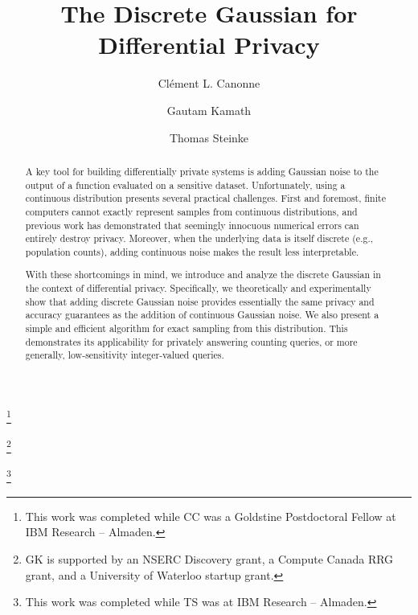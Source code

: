 \documentclass{jpcfinal} %
\begin{document}
\title{The Discrete Gaussian for Differential Privacy\rsuper*}

\author[C.~Canonne]{Cl\'ement L. Canonne}	\address{School of Computer Science, University of Sydney}	  \thanks{This work was completed while CC was a Goldstine Postdoctoral Fellow at IBM Research -- Almaden.}	

\author[G.~Kamath]{Gautam Kamath}	\address{Cheriton School of Computer Science, University of Waterloo}	  \thanks{GK is supported by an NSERC Discovery grant,
a Compute Canada RRG grant, and a University of Waterloo startup grant.}	

\author[T.~Steinke]{Thomas Steinke}	\address{Google Research, Brain Team}	
\thanks{This work was completed while TS was at IBM Research -- Almaden.}	









\begin{abstract}
  \noindent A key tool for building differentially private systems is adding Gaussian noise to the output of a function evaluated on a sensitive dataset. Unfortunately, using a continuous distribution presents several practical challenges.
First and foremost, finite computers cannot exactly represent samples from continuous distributions, and previous work has demonstrated that seemingly innocuous numerical errors can entirely destroy privacy. Moreover, when the underlying data is itself discrete (e.g., population counts), adding continuous noise makes the result less interpretable.

With these shortcomings in mind, we introduce and analyze the discrete Gaussian in the context of differential privacy. Specifically, we theoretically and experimentally show that adding discrete Gaussian noise provides essentially the same privacy and accuracy guarantees as the addition of continuous Gaussian noise. We also present a simple and efficient algorithm for exact sampling from this distribution. This demonstrates its applicability for privately answering counting queries, or more generally, low-sensitivity integer-valued queries.
\end{abstract}
\end{document}
